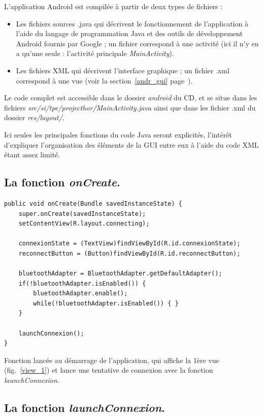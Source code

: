 L'application Android est compilée à partir de deux types de fichiers :
\begin{itemize}
	\item Les fichiers sources .java qui décrivent le fonctionnement de l'application à l'aide du langage de programmation Java et des outils de développement Android fournis par Google ; un fichier correspond à une activité (ici il n'y en a qu'une seule : l'activité principale \emph{MainActivity}).
	\item Les fichiers XML qui décrivent l'interface graphique ; un fichier .xml correspond à une vue (voir la section~\ref{andr_gui} page~\pageref{andr_gui}).
\end{itemize}

Le code complet est accessible dans le dossier \emph{android} du CD, et se situe dans les fichiers \emph{src/si/tpe/projecthor/MainActivity.java} ainsi que dans les fichier .xml du dossier \emph{res/layout/}.

Ici seules les principales fonctions du code Java seront explicités, l'intérêt d'expliquer l'organisation des éléments de la GUI entre eux à l'aide du code XML étant assez limité.

\lstset{language=Java}

\subsection{La fonction \emph{onCreate}.}

\begin{lstlisting}
public void onCreate(Bundle savedInstanceState) {
	super.onCreate(savedInstanceState);
	setContentView(R.layout.connecting);
	
	connexionState = (TextView)findViewById(R.id.connexionState);
	reconnectButton = (Button)findViewById(R.id.reconnectButton);

	bluetoothAdapter = BluetoothAdapter.getDefaultAdapter();
	if(!bluetoothAdapter.isEnabled()) {
		bluetoothAdapter.enable();
		while(!bluetoothAdapter.isEnabled()) { }
	}

	launchConnexion();
}
\end{lstlisting}
Fonction lancée au démarrage de l'application, qui affiche la 1ère vue (fig.~\ref{view_1}) et lance une tentative de connexion avec la fonction \emph{launchConnexion}. \\

\subsection{La fonction \emph{launchConnexion}.}

